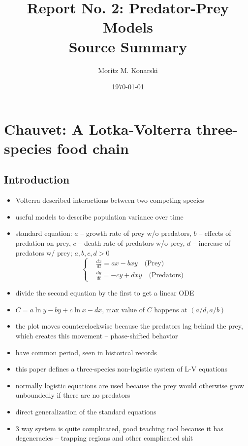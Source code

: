 \documentclass[a4paper,reqno,11pt]{article}
\title{Report No. 2: Predator-Prey Models\\Source Summary}
\author{Moritz M. Konarski}
\date{\today}
\begin{document}
\maketitle
\tableofcontents

\section{Chauvet: A Lotka-Volterra three-species food chain}

\subsection{Introduction}

\begin{itemize}
    \item Volterra described interactions between two competing species
    \item useful models to describe population variance over time
    \item standard equation: $a$ -- growth rate of prey w/o predators, $b$ --
        effects of predation on prey, $c$ -- death rate of predators w/o prey,
        $d$ -- increase of predators w/ prey; $a,b,c,d > 0$
        \begin{equation}\nonumber
            \left\{
            \begin{aligned}
                &\frac{dx}{dt} = ax - bxy \quad \text{(Prey)}\\
                &\frac{dy}{dt} = -cy +dxy \quad \text{(Predators)}
            \end{aligned}
            \right.
        \end{equation}
    \item divide the second equation by the first to get a linear ODE
    \item $C = a \ln y - by + c \ln x - dx$, max value of $C$ happens at
        $(a/d,a/b)$
    \item the plot moves counterclockwise because the predators lag behind the
        prey, which creates this movement -- phase-shifted behavior
    \item have common period, seen in historical records
    \item this paper defines a three-species non-logistic system of L-V
        equations
    \item normally logistic equations are used because the prey would otherwise
        grow unboundedly if there are no predators
    \item direct generalization of the standard equations
    \item 3 way system is quite complicated, good teaching tool because it has
        degeneracies -- trapping regions and other complicated shit
\end{itemize}
\end{document}
